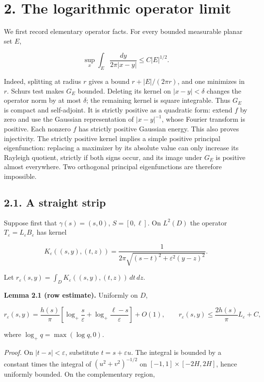 \documentclass[11pt]{article}
\begin{document}
\section{2. The logarithmic operator
limit}\label{the-logarithmic-operator-limit}

We first record elementary operator facts. For every bounded measurable
planar set \(E\),

\[
\sup_x\int_E\frac{dy}{2\pi|x-y|}\le C|E|^{1/2}.
\tag{2.1}
\]

Indeed, splitting at radius \(r\) gives a bound \(r+|E|/(2\pi r)\), and
one minimizes in \(r\). Schur\textquotesingle s test makes \(G_E\)
bounded. Deleting its kernel on \(|x-y|<\delta\) changes the operator
norm by at most \(\delta\); the remaining kernel is square integrable.
Thus \(G_E\) is compact and self-adjoint. It is strictly positive as a
quadratic form: extend \(f\) by zero and use the Gaussian representation
of \(|x-y|^{-1}\), whose Fourier transform is positive. Each nonzero
\(f\) has strictly positive Gaussian energy. This also proves
injectivity. The strictly positive kernel implies a simple positive
principal eigenfunction: replacing a maximizer by its absolute value can
only increase its Rayleigh quotient, strictly if both signs occur, and
its image under \(G_E\) is positive almost everywhere. Two orthogonal
principal eigenfunctions are therefore impossible.

\subsection{2.1. A straight strip}\label{a-straight-strip}

Suppose first that \(\gamma(s)=(s,0)\), \(S=[0,\ell]\). On \(L^2(D)\)
the operator \(T_\varepsilon=L_\varepsilon B_\varepsilon\) has kernel

\[
K_\varepsilon((s,y),(t,z))=
 \frac{1}{2\pi\sqrt{(s-t)^2+\varepsilon^2(y-z)^2}}.
\tag{2.2}
\]

Let \(r_\varepsilon(s,y)=\int_D K_\varepsilon((s,y),(t,z))\,dt\,dz\).

\textbf{Lemma 2.1 (row estimate).} Uniformly on \(D\),

\[
r_\varepsilon(s,y)=\frac{h(s)}\pi
 \left[\log_+\frac{s}{\varepsilon}
       +\log_+\frac{\ell-s}{\varepsilon}\right]+O(1),
\qquad
r_\varepsilon(s,y)\le\frac{2h(s)}\pi L_\varepsilon+C,
\tag{2.3}
\]

where \(\log_+q=\max(\log q,0)\).

\emph{Proof.} On \(|t-s|<\varepsilon\), substitute
\(t=s+\varepsilon u\). The integral is bounded by a constant times the
integral of \((u^2+v^2)^{-1/2}\) on \([-1,1]\times[-2H,2H]\), hence
uniformly bounded. On the complementary region,
\end{document}
